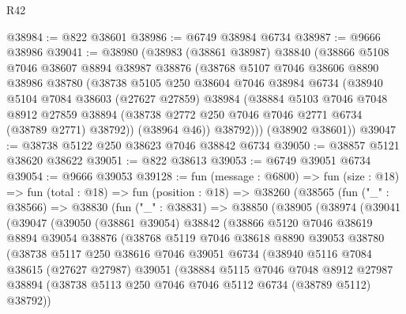 \begin{lexlean}{R42}
\begin{coremodule}
{@38984 := @822 @38601
@38986 := @6749 @38984 @6734
@38987 := @9666 @38986
@39041 := @38980
    (@38983
      (@38861 @38987)
      @38840
      (@38866
        @5108
        @7046
        @38607
        @8894
        @38987
        @38876
        (@38768
          @5107
          @7046
          @38606
          @8890
          @38986
          @38780
          (@38738
            @5105
            @250
            @38604
            @7046
            @38984
            @6734
            (@38940
              @5104
              @7084
              @38603
              (@27627 @27859)
              @38984
              (@38884
                @5103
                @7046
                @7048
                @8912
                @27859
                @38894
                (@38738 @2772 @250 @7046 @7046 @2771 @6734 (@38789 @2771) @38792))
              (@38964 @46))
            @38792)))
      (@38902 @38601))
@39047 := @38738 @5122 @250 @38623 @7046 @38842 @6734
@39050 := @38857 @5121 @38620 @38622
@39051 := @822 @38613
@39053 := @6749 @39051 @6734
@39054 := @9666 @39053
@39128 := fun (message : @6800) =>
  fun (size : @18) =>
  fun (total : @18) =>
  fun (position : @18) =>
  @38260
    (@38565
      (fun ("_" : @38566) =>
      @38830
        (fun ("_" : @38831) =>
        @38850
          (@38905
            (@38974
              (@39041
                (@39047
                  (@39050
                    (@38861 @39054)
                    @38842
                    (@38866
                      @5120
                      @7046
                      @38619
                      @8894
                      @39054
                      @38876
                      (@38768
                        @5119
                        @7046
                        @38618
                        @8890
                        @39053
                        @38780
                        (@38738
                          @5117
                          @250
                          @38616
                          @7046
                          @39051
                          @6734
                          (@38940
                            @5116
                            @7084
                            @38615
                            (@27627 @27987)
                            @39051
                            (@38884
                              @5115
                              @7046
                              @7048
                              @8912
                              @27987
                              @38894
                              (@38738 @5113 @250 @7046 @7046 @5112 @6734 (@38789 @5112) @38792))
}
\end{coremodule}
\end{lexlean}
